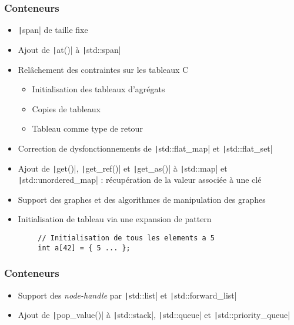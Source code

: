 \documentclass[C++.tex]{subfiles}
\begin{document}
\begin{frame}[fragile]
	\frametitle{Conteneurs}
	\begin{itemize}
		\item \texttt|span| de taille fixe
		\item Ajout de \texttt|at()| à \texttt|std::span|
		\item Relâchement des contraintes sur les tableaux C
		\begin{itemize}
			\item Initialisation des tableaux d'agrégats
			\item Copies de tableaux
			\item Tableau comme type de retour
		\end{itemize}
		\item Correction de dysfonctionnements de \texttt|std::flat_map| et \texttt|std::flat_set|
		\item Ajout de \texttt|get()|, \texttt|get_ref()| et \texttt|get_as()| à \texttt|std::map| et \texttt|std::unordered_map| : récupération de la valeur associée à une clé
		\item Support des graphes et des algorithmes de manipulation des graphes
		\item Initialisation de tableau via une expansion de pattern
	\end{itemize}

	\begin{verbatim}
		// Initialisation de tous les elements a 5
		int a[42] = { 5 ... };
	\end{verbatim}

\end{frame}

\begin{frame}[fragile]
	\frametitle{Conteneurs}
	\begin{itemize}
		\item Support des \textit{node-handle} par \texttt|std::list| et \texttt|std::forward_list|
		\item Ajout de \texttt|pop_value()| à \texttt|std::stack|, \texttt|std::queue| et \texttt|std::priority_queue|
	\end{itemize}

\end{frame}
\end{document}
